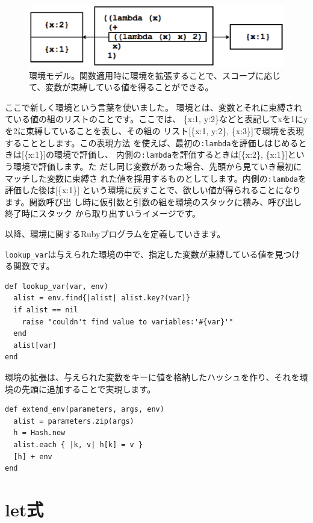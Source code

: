 \begin{figure}[htbp]
\begin{center}
\includegraphics[width=120mm]{images/environment2.eps}
\end{center}
\caption{環境モデル。関数適用時に環境を拡張することで、スコープに応じて、変数が束縛している値を得ることができる。}
\label{fig:environment2}
\end{figure}

ここで新しく環境という言葉を使いました。
環境とは、変数とそれに束縛されている値の組のリストのことです。ここでは、
\{x:1, y:2\}などと表記してxを1にyを2に束縛していることを表し、その組の
リスト[\{x:1, y:2\}, \{x:3\}]で環境を表現することとします。この表現方法
を使えば、最初の{\tt :lambda}を評価しはじめるときは[\{x:1\}]の環境で評価し、
内側の{\tt :lambda}を評価するときは[\{x:2\}, \{x:1\}]という環境で評価します。た
だし同じ変数があった場合、先頭から見ていき最初にマッチした変数に束縛さ
れた値を採用するものとしてします。内側の{\tt :lambda}を評価した後は[\{x:1\}]
という環境に戻すことで、欲しい値が得られることになります。関数呼び出
し時に仮引数と引数の組を環境のスタックに積み、呼び出し終了時にスタック
から取り出すいうイメージです。

以降、環境に関するRubyプログラムを定義していきます。

{\tt lookup\_var}は与えられた環境の中で、指定した変数が束縛している値を見つける関数です。

\begin{lstlisting}
def lookup_var(var, env)
  alist = env.find{|alist| alist.key?(var)}
  if alist == nil
    raise "couldn't find value to variables:'#{var}'"
  end
  alist[var]
end  
\end{lstlisting}

環境の拡張は、与えられた変数をキーに値を格納したハッシュを作り、それを環境の先頭に追加することで実現します。

\begin{lstlisting}
def extend_env(parameters, args, env)
  alist = parameters.zip(args)
  h = Hash.new
  alist.each { |k, v| h[k] = v }
  [h] + env
end
\end{lstlisting}

\section{let式}

